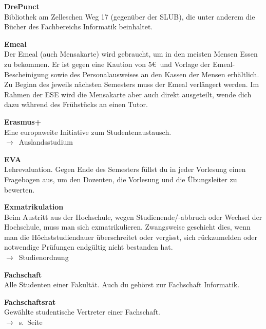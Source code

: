 \begin{multicols}{2}

\textbf{DrePunct} \\
Bibliothek am Zelleschen Weg 17 (gegenüber der SLUB), die unter anderem die Bücher des Fachbereichs Informatik beinhaltet.

\textbf{Emeal} \\
Der Emeal (auch Mensakarte) wird gebraucht, um in den meisten Mensen Essen zu bekommen.
Er ist gegen eine Kaution von 5\euro\ und Vorlage der Emeal-Bescheinigung sowie des Personalausweises an den Kassen der Mensen erhältlich.
Zu Beginn des jeweils nächsten Semesters muss der Emeal verlängert werden.
Im Rahmen der ESE wird die Mensakarte aber auch direkt ausgeteilt, wende dich dazu während des Frühstücks an einen Tutor.

\textbf{Erasmus+} \\
Eine europaweite Initiative zum Studentenaustausch.\\
$\rightarrow$~Auslandsstudium

\textbf{EVA} \\
Lehrevaluation. Gegen Ende des Semesters füllst du in jeder Vorlesung einen Fragebogen aus, um den Dozenten, die Vorlesung und die Übungsleiter zu bewerten.

\textbf{Exmatrikulation} \\
Beim Austritt aus der Hochschule, wegen Studienende/-abbruch oder Wechsel der Hochschule, muss man sich exmatrikulieren.
Zwangsweise geschieht dies, wenn man die Höchststudiendauer überschreitet oder vergisst, sich rückzumelden oder notwendige Prüfungen endgültig nicht bestanden hat.\\
$\rightarrow$~Studienordnung

\textbf{Fachschaft} \\
Alle Studenten einer Fakultät. Auch du gehörst zur Fachschaft Informatik.

\textbf{Fachschaftsrat} \\
Gewählte studentische Vertreter einer Fachschaft.\\
$\rightarrow$~s.~Seite~\pageref{sec:fachschaftsrat}



\end{multicols}
